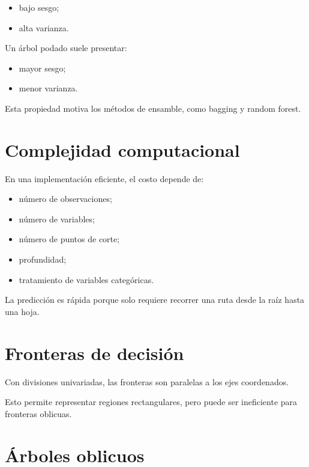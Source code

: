 \documentclass[
  spanish,
  10.5pt,
  letterpaper,
  DIV=11,
  numbers=noendperiod,
  oneside,
  open=any]{scrreprt}
\providecommand{\tightlist}{%
  \setlength{\itemsep}{0pt}\setlength{\parskip}{0pt}}
\theoremstyle{definition}
\theoremstyle{definition}
\theoremstyle{plain}
\theoremstyle{remark}
\begin{document}
\begin{itemize}
\tightlist
\item
  bajo sesgo;
\item
  alta varianza.
\end{itemize}

Un árbol podado suele presentar:

\begin{itemize}
\tightlist
\item
  mayor sesgo;
\item
  menor varianza.
\end{itemize}

Esta propiedad motiva los métodos de ensamble, como bagging y random
forest.

\section*{Complejidad computacional}\label{complejidad-computacional}


En una implementación eficiente, el costo depende de:

\begin{itemize}
\tightlist
\item
  número de observaciones;
\item
  número de variables;
\item
  número de puntos de corte;
\item
  profundidad;
\item
  tratamiento de variables categóricas.
\end{itemize}

La predicción es rápida porque solo requiere recorrer una ruta desde la
raíz hasta una hoja.

\section*{Fronteras de decisión}\label{fronteras-de-decisiuxf3n-1}


Con divisiones univariadas, las fronteras son paralelas a los ejes
coordenados.

Esto permite representar regiones rectangulares, pero puede ser
ineficiente para fronteras oblicuas.

\section*{Árboles oblicuos}\label{uxe1rboles-oblicuos}
\end{document}

